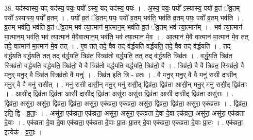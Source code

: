 \documentclass[17pt]{extarticle}
\begin{document}
38. यद॑स्यास्य॒ यद् यद॑स्य॒ पयः॒ पयो᳚ ऽस्य॒ यद् यद॑स्य॒ पयः॑ । . अ॒स्य॒ पयः॒ पयो᳚ ऽस्यास्य॒ पयो᳚ व्र॒तं ॅव्र॒तम् पयो᳚ ऽस्यास्य॒ पयो᳚ व्र॒तम् । . पयो᳚ व्र॒तं ॅव्र॒तम् पयः॒ पयो᳚ व्र॒तम् भव॑ति॒ भव॑ति व्र॒तम् पयः॒ पयो᳚ व्र॒तम् भव॑ति । . व्र॒तम् भव॑ति॒ भव॑ति व्र॒तं ॅव्र॒तम् भव॑ त्या॒त्मान॑ मा॒त्मान॒म् भव॑ति व्र॒तं ॅव्र॒तम् भव॑ त्या॒त्मान᳚म् । . भव॑ त्या॒त्मान॑ मा॒त्मान॒म् भव॑ति॒ भव॑ त्या॒त्मान॑ मे॒वैवात्मान॒म् भव॑ति॒ भव॑ त्या॒त्मान॑ मे॒व । . आ॒त्मान॑ मे॒वै वात्मान॑ मा॒त्मान॑ मे॒व तत् तदे॒ वात्मान॑ मा॒त्मान॑ मे॒व तत् । . ए॒व तत् तदे॒ वैव तद् व॑र्द्धयति वर्द्धयति॒ तदे॒ वैव तद् व॑र्द्धयति । . तद् व॑र्द्धयति वर्द्धयति॒ तत् तद् व॑र्द्धयति॒ त्रिव्र॑त॒ स्त्रिव्र॑तो वर्द्धयति॒ तत् तद् व॑र्द्धयति॒ त्रिव्र॑तः । . व॒र्द्ध॒य॒ति॒ त्रिव्र॑त॒ स्त्रिव्र॑तो वर्द्धयति वर्द्धयति॒ त्रिव्र॑तो॒ वै वै त्रिव्र॑तो वर्द्धयति वर्द्धयति॒ त्रिव्र॑तो॒ वै । . त्रिव्र॑तो॒ वै वै त्रिव्र॑त॒ स्त्रिव्र॑तो॒ वै मनु॒र् मनु॒र् वै त्रिव्र॑त॒ स्त्रिव्र॑तो॒ वै मनुः॑ । . त्रिव्र॑त॒ इति॒ त्रि - व्र॒तः॒ । . वै मनु॒र् मनु॒र् वै वै मनु॑ रासी दासी॒न् मनु॒र् वै वै मनु॑ रासीत् । . मनु॑ रासी दासी॒न् मनु॒र् मनु॑ रासी॒द् द्विव्र॑ता॒ द्विव्र॑ता आसी॒न् मनु॒र् मनु॑ रासी॒द् द्विव्र॑ताः । . आ॒सी॒द् द्विव्र॑ता॒ द्विव्र॑ता आसी दासी॒द् द्विव्र॑ता॒ असु॑रा॒ असु॑रा॒ द्विव्र॑ता आसी दासी॒द् द्विव्र॑ता॒ असु॑राः । . द्विव्र॑ता॒ असु॑रा॒ असु॑रा॒ द्विव्र॑ता॒ द्विव्र॑ता॒ असु॑रा॒ एक॑व्रता॒ एक॑व्रता॒ असु॑रा॒ द्विव्र॑ता॒ द्विव्र॑ता॒ असु॑रा॒ एक॑व्रताः । . द्विव्र॑ता॒ इति॒ द्वि - व्र॒ताः॒ । . असु॑रा॒ एक॑व्रता॒ एक॑व्रता॒ असु॑रा॒ असु॑रा॒ एक॑व्रता दे॒वा दे॒वा एक॑व्रता॒ असु॑रा॒ असु॑रा॒ एक॑व्रता दे॒वाः । . एक॑व्रता दे॒वा दे॒वा एक॑व्रता॒ एक॑व्रता दे॒वाः प्रा॒तः प्रा॒तर् दे॒वा एक॑व्रता॒ एक॑व्रता दे॒वाः प्रा॒तः । . एक॑व्रता॒ इत्येक॑ - व्र॒ताः॒ । \newline
\pagebreak
{}
\end{document}
